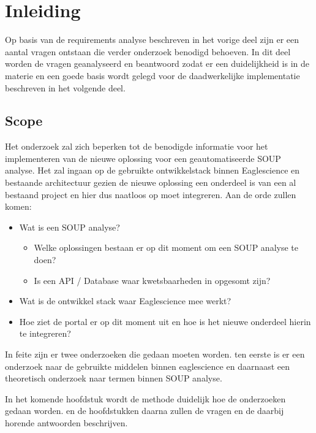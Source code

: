 
\chapter{Inleiding} %

\label{inOnderzoek} %
Op basis van de requirements analyse beschreven in het vorige deel zijn er een aantal vragen ontstaan die verder onderzoek benodigd behoeven. In dit deel worden de vragen geanalyseerd en beantwoord zodat er een duidelijkheid is in de materie en een goede basis wordt gelegd voor de daadwerkelijke implementatie beschreven in het volgende deel.

\section{Scope}
Het onderzoek zal zich beperken tot de benodigde informatie voor het implementeren van de nieuwe oplossing voor een geautomatiseerde SOUP analyse. Het zal ingaan op de gebruikte ontwikkelstack binnen Eaglescience en bestaande architectuur gezien de nieuwe oplossing een onderdeel is van een al bestaand project en hier dus naatloos op moet integreren.
Aan de orde zullen komen:
\begin{itemize}
\item Wat is een SOUP analyse?
  \begin{itemize}
  \item Welke oplossingen bestaan er op dit moment om een SOUP analyse te doen?
  \item Is een API / Database waar kwetsbaarheden in opgesomt zijn?
  \end{itemize}
\item Wat is de ontwikkel stack waar Eaglescience mee werkt?
\item Hoe ziet de portal er op dit moment uit en hoe is het nieuwe onderdeel hierin te integreren?
\end{itemize}

In feite zijn er twee onderzoeken die gedaan moeten worden. ten eerste is er een onderzoek naar de gebruikte middelen binnen eaglescience en daarnaast een theoretisch onderzoek naar termen binnen SOUP analyse.

In het komende hoofdstuk wordt de methode duidelijk hoe de onderzoeken gedaan worden.
en de hoofdstukken daarna zullen de vragen en de daarbij horende antwoorden beschrijven.
